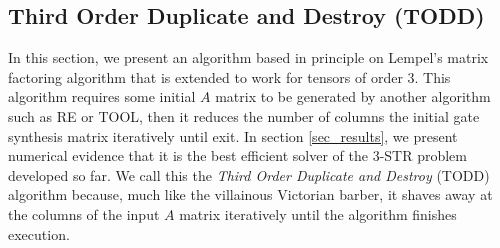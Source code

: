 \documentclass[notitlepage]{article}
\theoremstyle{definition}
\theoremstyle{problem}
\theoremstyle{lemma}
\begin{document}
\subsection{Third Order Duplicate and Destroy (TODD)}
\label{sec_TODD}
In this section, we present an algorithm based in principle on Lempel's matrix factoring algorithm \cite{8_Lempel_1975} that is extended to work for tensors of order 3. This algorithm requires some initial $A$ matrix to be generated by another algorithm such as RE or TOOL, then it reduces the number of columns the initial gate synthesis matrix iteratively until exit. In section \ref{sec_results}, we present numerical evidence that it is the best efficient solver of the 3-STR problem developed so far.
We call this the \emph{Third Order Duplicate and Destroy} (TODD) algorithm because, much like the villainous Victorian barber, it shaves away at the columns of the input $A$ matrix iteratively until the algorithm finishes execution.

\end{document}
